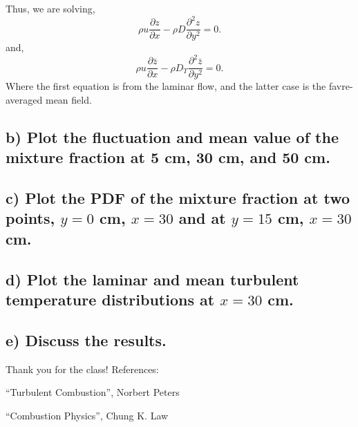 \documentclass{article}
\begin{document}
Thus, we are solving, 
\begin{equation}
\rho u \frac{\partial z}{\partial x} - \rho D \frac{\partial^2
  z}{\partial y^2} = 0. 
\end{equation}
and, 
\begin{equation}
\rho u \frac{\partial \bar z}{\partial x} - \rho D_T \frac{\partial^2
  \bar z}{\partial y^2} = 0. 
\end{equation}
Where the first equation is from the laminar flow, and the latter case
is the favre-averaged mean field.  

\subsection*{b) Plot the fluctuation and mean value of the mixture fraction
  at 5 cm, 30 cm, and 50 cm.}

\subsection*{c) Plot the PDF of the mixture fraction at two points, $y=0$ cm,
$x=30$ and at $y=15$ cm, $x=30$ cm.}


\subsection*{d) Plot the laminar and mean turbulent temperature
distributions at $x=30$ cm.}

\subsection*{e) Discuss the results.}


\newpage

Thank you for the class! 
\vspace{1in}
\newline
References:

``Turbulent Combustion'', Norbert Peters

``Combustion Physics'', Chung K. Law
\end{document}
